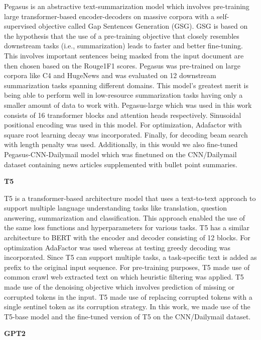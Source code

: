 \documentclass{article}
\begin{document}
\begin{appendices}
Pegasus \cite{pegasus} is an abstractive text-summarization model which involves pre-training large transformer-based encoder-decoders on massive corpora with a self-supervised objective called Gap Sentences Generation (GSG). GSG is based on the hypothesis that the use of a pre-training objective that closely resembles downstream tasks (i.e., summarization) leads to faster and better fine-tuning.  This involves important sentences being masked from  the input document are then chosen based on the Rouge1F1 scores. Pegasus was pre-trained on large corpora like C4 and HugeNews and was evaluated on 12 downstream summarization tasks spanning different domains. This model’s greatest merit is being able to perform well in low-resource summarization tasks having only a smaller amount of data to work with. Pegasus-large which was used in this work consists of 16 transformer blocks and attention heads respectively. Sinusoidal positional encoding was used in this model. For optimization, Adafactor with square root learning decay was incorporated. Finally, for decoding beam search with length penalty was used. Additionally, in this would we also fine-tuned Pegasus-CNN-Dailymail model which was finetuned on the CNN/Dailymail dataset containing news articles supplemented with bullet point summaries.

\textbf{T5}

T5 \cite{t5abstractive} is a transformer-based architecture model that uses a text-to-text approach to support multiple language understanding tasks like translation, question answering, summarization and classification. This approach enabled the use of the same loss functions and hyperparameters for various tasks. T5 has a similar architecture to BERT with the encoder and decoder consisting of 12 blocks. For optimization AdaFactor was used whereas at testing greedy decoding was incorporated. Since T5 can support multiple tasks, a task-specific text is added as prefix to the original input sequence. For pre-training purposes, T5 made use of common crawl web extracted text on which heuristic filtering was applied. T5 made use of the denoising objective which involves prediction of missing or corrupted tokens in the input. T5 made use of replacing corrupted tokens with a single sentinel token as its corruption strategy. In this work, we made use of the T5-base model and the fine-tuned version of T5 on the CNN/Dailymail dataset.

\textbf{GPT2}


\end{appendices}
\end{document}
